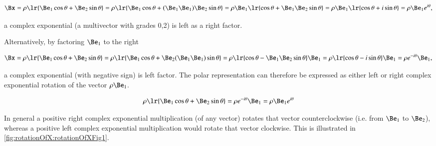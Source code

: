 \begin{dmath}\label{eqn:SimpleProducts2:940}
\Bx
=
\rho \lr{ \Be_1 \cos\theta + \Be_2 \sin\theta }
=
\rho \lr{ \Be_1 \cos\theta + (\Be_1 \Be_1) \Be_2 \sin\theta }
=
\rho \Be_1 \lr{ \cos\theta + \Be_1 \Be_2 \sin\theta }
=
\rho \Be_1 \lr{ \cos\theta + i \sin\theta }
=
\rho \Be_1 e^{i\theta},
\end{dmath}

a complex exponential (a multivector with grades 0,2) is left as a right factor.

Alternatively, by factoring \( \Be_1 \) to the right

\begin{dmath}\label{eqn:SimpleProducts2:960}
\Bx
=
\rho \lr{ \Be_1 \cos\theta + \Be_2 \sin\theta }
=
\rho \lr{ \Be_1 \cos\theta + \Be_2 (\Be_1 \Be_1) \sin\theta }
=
\rho \lr{ \cos\theta - \Be_1 \Be_2 \sin\theta } \Be_1
=
\rho \lr{ \cos\theta - i \sin\theta } \Be_1
=
\rho e^{-i\theta} \Be_1,
\end{dmath}

a complex exponential (with negative sign) is left factor.
The polar representation can therefore be expressed as either left or right complex exponential rotation of the vector \( \rho \Be_1 \).

\begin{equation}\label{eqn:SimpleProducts2:1120}
\rho \lr{ \Be_1 \cos\theta + \Be_2 \sin\theta }
= \rho e^{-i\theta} \Be_1 = \rho \Be_1 e^{i\theta}
\end{equation}

In general a positive right complex exponential multiplication (of any vector) rotates that vector counterclockwise (i.e. from \( \Be_1 \) to \( \Be_2 \)), whereas a positive left complex exponential multiplication would rotate that vector clockwise.  This is
illustrated in \cref{fig:rotationOfX:rotationOfXFig1}.

